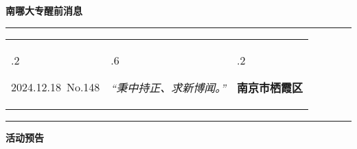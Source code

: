 \documentclass[letterpaper, 12pt]{article}
\begin{document}
\begin{center}
    \Huge\textbf{南哪大专醒前消息}
\end{center}
\vspace{4mm}
\hrule
\renewcommand\tabularxcolumn[1]{m{#1}}
\begin{tabularx}{\textwidth}{>{\hsize.2\hsize}X>{\hsize.6\hsize}X>{\hsize.2\hsize}X}
    \begin{flushleft}
        2024.12.18\, No.148
    \end{flushleft}
    &
    \begin{center}
        \textit{“秉中持正、求新博闻。”}
    \end{center}
    &
    \begin{flushright}
        \textbf{南京市栖霞区}
    \end{flushright}
\end{tabularx}
\vspace{-3.5mm}
\hrule
\vspace{4mm}
\centerline{\huge\textbf{活动预告}}
\end{document}
